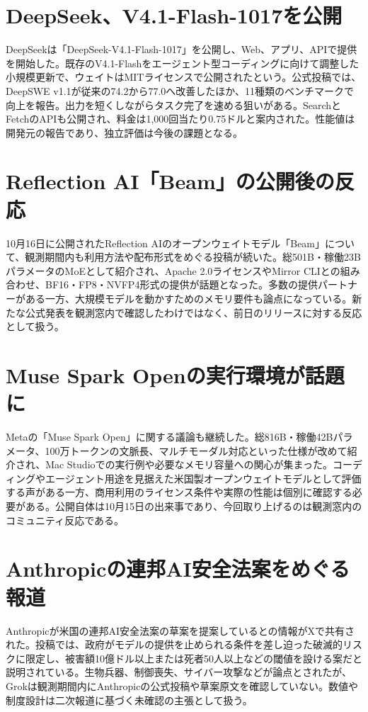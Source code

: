 \section{DeepSeek、V4.1-Flash-1017を公開}
DeepSeekは「DeepSeek-V4.1-Flash-1017」を公開し、Web、アプリ、APIで提供を開始した。既存のV4.1-Flashをエージェント型コーディングに向けて調整した小規模更新で、ウェイトはMITライセンスで公開されたという。公式投稿では、DeepSWE v1.1が従来の74.2から77.0へ改善したほか、11種類のベンチマークで向上を報告。出力を短くしながらタスク完了を速める狙いがある。SearchとFetchのAPIも公開され、料金は1,000回当たり0.75ドルと案内された。性能値は開発元の報告であり、独立評価は今後の課題となる。

\section{Reflection AI「Beam」の公開後の反応}
10月16日に公開されたReflection AIのオープンウェイトモデル「Beam」について、観測期間内も利用方法や配布形式をめぐる投稿が続いた。総501B・稼働23BパラメータのMoEとして紹介され、Apache 2.0ライセンスやMirror CLIとの組み合わせ、BF16・FP8・NVFP4形式の提供が話題となった。多数の提供パートナーがある一方、大規模モデルを動かすためのメモリ要件も論点になっている。新たな公式発表を観測窓内で確認したわけではなく、前日のリリースに対する反応として扱う。

\section{Muse Spark Openの実行環境が話題に}
Metaの「Muse Spark Open」に関する議論も継続した。総816B・稼働42Bパラメータ、100万トークンの文脈長、マルチモーダル対応といった仕様が改めて紹介され、Mac Studioでの実行例や必要なメモリ容量への関心が集まった。コーディングやエージェント用途を見据えた米国製オープンウェイトモデルとして評価する声がある一方、商用利用のライセンス条件や実際の性能は個別に確認する必要がある。公開自体は10月15日の出来事であり、今回取り上げるのは観測窓内のコミュニティ反応である。

\section{Anthropicの連邦AI安全法案をめぐる報道}
Anthropicが米国の連邦AI安全法案の草案を提案しているとの情報がXで共有された。投稿では、政府がモデルの提供を止められる条件を差し迫った破滅的リスクに限定し、被害額10億ドル以上または死者50人以上などの閾値を設ける案だと説明されている。生物兵器、制御喪失、サイバー攻撃などが論点とされたが、Grokは観測期間内にAnthropicの公式投稿や草案原文を確認していない。数値や制度設計は二次報道に基づく未確認の主張として扱う。


